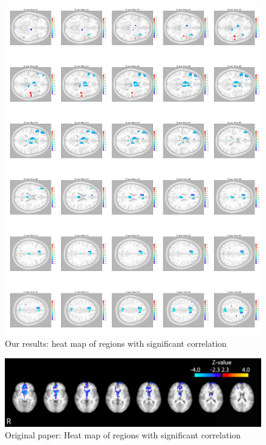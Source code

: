 \documentclass[11pt]{article}
\begin{document}
\begin{figure}[H]
    \centering
        \includegraphics[scale=0.1]{figures/Regression3/sig_cor_z_loss.png}
    \caption{Our results: heat map of regions with significant correlation}
\end{figure}

\begin{figure}[H]
    \centering
        \includegraphics[scale=0.5]{figures/Regression3/Orig_sig_cor_z_loss.png}
    \caption{Original paper: Heat map of regions with significant correlation}
\end{figure}

\newpage
\end{document}
